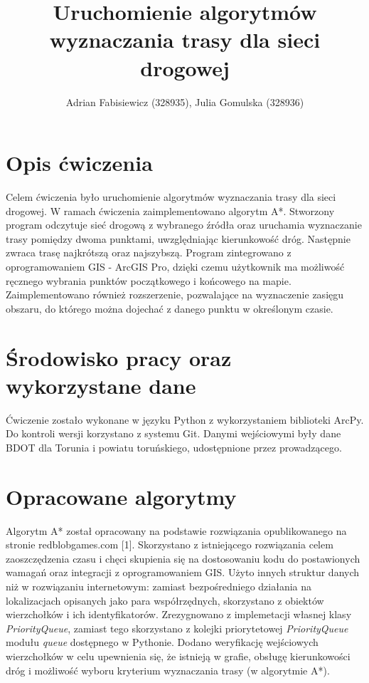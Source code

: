 \documentclass{article}
\title{Uruchomienie algorytmów wyznaczania trasy dla sieci drogowej}
\author{Adrian Fabisiewicz (328935), Julia Gomulska (328936)}
\begin{document}
\maketitle
\renewcommand{\labelenumii}{\arabic{enumi}.\arabic{enumii}}
\renewcommand{\labelenumiii}{\arabic{enumi}.\arabic{enumii}.\arabic{enumiii}}
\renewcommand{\labelenumiv}{\arabic{enumi}.\arabic{enumii}.\arabic{enumiii}.\arabic{enumiv}}

\section{Opis ćwiczenia}

Celem ćwiczenia było uruchomienie algorytmów wyznaczania trasy dla sieci drogowej. W ramach ćwiczenia zaimplementowano algorytm A*. Stworzony program odczytuje sieć drogową z wybranego źródła oraz uruchamia wyznaczanie trasy pomiędzy dwoma punktami, uwzględniając kierunkowość dróg. Następnie zwraca trasę najkrótszą oraz najszybszą. Program zintegrowano z oprogramowaniem GIS - ArcGIS Pro, dzięki czemu użytkownik ma możliwość ręcznego wybrania punktów początkowego i końcowego na mapie. Zaimplementowano również rozszerzenie, pozwalające na wyznaczenie zasięgu obszaru, do którego można dojechać z danego punktu w określonym czasie.

\section{Środowisko pracy oraz wykorzystane dane}
Ćwiczenie zostało wykonane w języku Python z wykorzystaniem biblioteki ArcPy. Do kontroli wersji korzystano z systemu Git. Danymi wejściowymi były dane BDOT dla Torunia i powiatu toruńskiego, udostępnione przez prowadzącego.

\section{Opracowane algorytmy}
Algorytm A* został opracowany na podstawie rozwiązania opublikowanego na stronie redblobgames.com [1].
Skorzystano z istniejącego rozwiązania celem zaoszczędzenia czasu i chęci skupienia się na dostosowaniu kodu do postawionych wamagań oraz integracji z oprogramowaniem GIS.
Użyto innych struktur danych niż w rozwiązaniu internetowym: zamiast bezpośredniego działania na lokalizacjach opisanych jako para współrzędnych, skorzystano z obiektów wierzchołków i ich identyfikatorów.
Zrezygnowano z implemetacji własnej klasy \textit{PriorityQueue}, zamiast tego skorzystano z kolejki priorytetowej \textit{PriorityQueue} modułu \textit{queue} dostępnego w Pythonie.
Dodano weryfikację wejściowych wierzchołków w celu upewnienia się, że istnieją w grafie, obsługę kierunkowości dróg i możliwość wyboru kryterium wyznaczania trasy (w algorytmie A*). 
\end{document}
